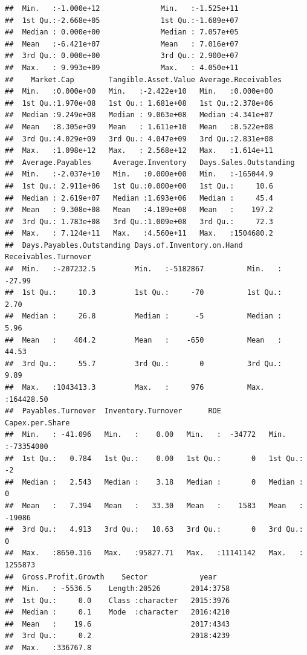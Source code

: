 \documentclass[11pt,]{article}
\begin{document}
\begin{verbatim}
##  Min.   :-1.000e+12              Min.   :-1.525e+11            
##  1st Qu.:-2.668e+05              1st Qu.:-1.689e+07            
##  Median : 0.000e+00              Median : 7.057e+05            
##  Mean   :-6.421e+07              Mean   : 7.016e+07            
##  3rd Qu.: 0.000e+00              3rd Qu.: 2.900e+07            
##  Max.   : 9.993e+09              Max.   : 4.050e+11            
##    Market.Cap        Tangible.Asset.Value Average.Receivables
##  Min.   :0.000e+00   Min.   :-2.422e+10   Min.   :0.000e+00  
##  1st Qu.:1.970e+08   1st Qu.: 1.681e+08   1st Qu.:2.378e+06  
##  Median :9.249e+08   Median : 9.063e+08   Median :4.341e+07  
##  Mean   :8.305e+09   Mean   : 1.611e+10   Mean   :8.522e+08  
##  3rd Qu.:4.029e+09   3rd Qu.: 4.047e+09   3rd Qu.:2.831e+08  
##  Max.   :1.098e+12   Max.   : 2.568e+12   Max.   :1.614e+11  
##  Average.Payables     Average.Inventory   Days.Sales.Outstanding
##  Min.   :-2.037e+10   Min.   :0.000e+00   Min.   :-165044.9     
##  1st Qu.: 2.911e+06   1st Qu.:0.000e+00   1st Qu.:     10.6     
##  Median : 2.619e+07   Median :1.693e+06   Median :     45.4     
##  Mean   : 9.308e+08   Mean   :4.189e+08   Mean   :    197.2     
##  3rd Qu.: 1.783e+08   3rd Qu.:1.009e+08   3rd Qu.:     72.3     
##  Max.   : 7.124e+11   Max.   :4.560e+11   Max.   :1504680.2     
##  Days.Payables.Outstanding Days.of.Inventory.on.Hand Receivables.Turnover
##  Min.   :-207232.5         Min.   :-5182867          Min.   :   -27.99   
##  1st Qu.:     10.3         1st Qu.:     -70          1st Qu.:     2.70   
##  Median :     26.8         Median :      -5          Median :     5.96   
##  Mean   :    404.2         Mean   :    -650          Mean   :    44.53   
##  3rd Qu.:     55.7         3rd Qu.:       0          3rd Qu.:     9.89   
##  Max.   :1043413.3         Max.   :     976          Max.   :164428.50   
##  Payables.Turnover  Inventory.Turnover      ROE           Capex.per.Share    
##  Min.   : -41.096   Min.   :    0.00   Min.   :  -34772   Min.   :-73354000  
##  1st Qu.:   0.784   1st Qu.:    0.00   1st Qu.:       0   1st Qu.:       -2  
##  Median :   2.543   Median :    3.18   Median :       0   Median :        0  
##  Mean   :   7.394   Mean   :   33.30   Mean   :    1583   Mean   :   -19086  
##  3rd Qu.:   4.913   3rd Qu.:   10.63   3rd Qu.:       0   3rd Qu.:        0  
##  Max.   :8650.316   Max.   :95827.71   Max.   :11141142   Max.   :  1255873  
##  Gross.Profit.Growth    Sector            year     
##  Min.   : -5536.5    Length:20526       2014:3758  
##  1st Qu.:     0.0    Class :character   2015:3976  
##  Median :     0.1    Mode  :character   2016:4210  
##  Mean   :    19.6                       2017:4343  
##  3rd Qu.:     0.2                       2018:4239  
##  Max.   :336767.8
\end{verbatim}
\end{document}
